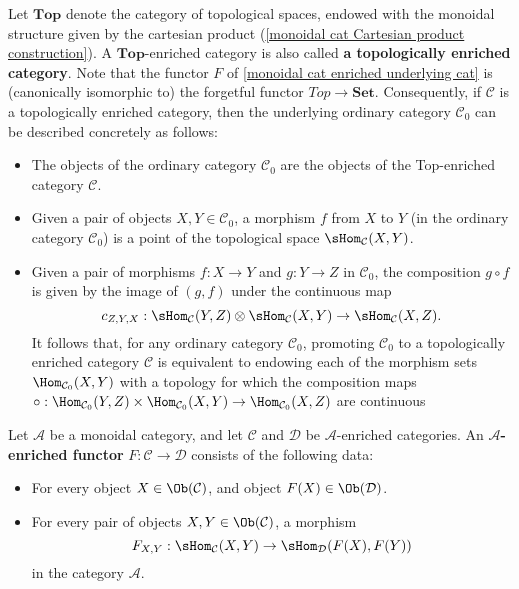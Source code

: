 \begin{example}\label{monoidal cat enriched over Top}
Let $\mathbf{Top}$ denote the category of topological spaces, endowed with the monoidal structure given by the cartesian product (\cref{monoidal cat Cartesian product construction}). A $\mathbf{Top}$-enriched category is also called \textbf{a topologically enriched category}. Note that the functor $F$ of \cref{monoidal cat enriched underlying cat} is (canonically isomorphic to) the forgetful functor $Top\to\mathbf{Set}$. Consequently, if $\mathcal{C}$ is a topologically enriched category, then the underlying ordinary category $\mathcal{C}_0$ can be described concretely as follows:
\begin{itemize}
\item The objects of the ordinary category $\mathcal{C}_0$ are the objects of the Top-enriched category $\mathcal{C}$.
\item Given a pair of objects $X,Y\in\mathcal{C}_0$, a morphism $f$ from $X$ to $Y$ (in the ordinary category $\mathcal{C}_0$) is a point of the topological space $\sHom_{\mathcal{C}}(X,Y)$.
\item Given a pair of morphisms $f:X\to Y$ and $g:Y\to Z$ in $\mathcal{C}_0$, the composition $g\circ f$ is given by the image of $(g,f)$ under the continuous map
\[c_{Z,Y,X}:\sHom_{\mathcal{C}}(Y,Z)\otimes\sHom_{\mathcal{C}}(X,Y)\to\sHom_{\mathcal{C}}(X,Z).\]
It follows that, for any ordinary category $\mathcal{C}_0$, promoting $\mathcal{C}_0$ to a topologically enriched category $\mathcal{C}$ is equivalent to endowing each of the morphism sets $\Hom_{\mathcal{C}_0}(X,Y)$ with a topology for which the composition maps $\circ:\Hom_{\mathcal{C}_0}(Y,Z)\times\Hom_{\mathcal{C}_0}(X,Y)\to\Hom_{\mathcal{C}_0}(X,Z)$ are continuous
\end{itemize}
\end{example}
Let $\mathcal{A}$ be a monoidal category, and let $\mathcal{C}$ and $\mathcal{D}$ be $\mathcal{A}$-enriched categories. An \textbf{$\mathcal{A}$-enriched functor} $F:\mathcal{C}\to\mathcal{D}$ consists of the following data:
\begin{itemize}
\item For every object $X\in\Ob(\mathcal{C})$, and object $F(X)\in\Ob(\mathcal{D})$.
\item For every pair of objects $X,Y\in\Ob(\mathcal{C})$, a morphism
\[F_{X,Y}:\sHom_{\mathcal{C}}(X,Y)\to\sHom_{\mathcal{D}}(F(X),F(Y))\]
in the category $\mathcal{A}$.
\end{itemize}

